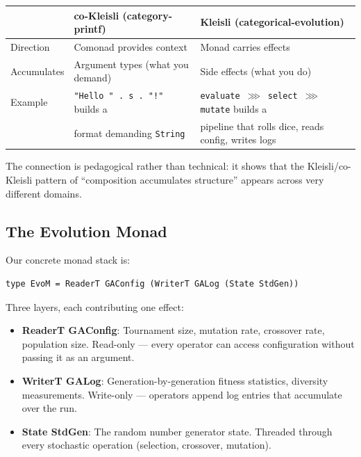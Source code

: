 \documentclass[10pt]{article}
\begin{document}
\begin{table}[ht]
\centering
\small
\begin{tabular}{@{}lll@{}}
\toprule
 & \textbf{co-Kleisli (category-printf)} & \textbf{Kleisli (categorical-evolution)} \\
\midrule
Direction    & Comonad provides context & Monad carries effects \\
Accumulates  & Argument types (what you demand) & Side effects (what you do) \\
Example      & \texttt{"Hello " . s . "!"} builds a & \texttt{evaluate $\ggg$ select $\ggg$ mutate} builds a \\
             & format demanding \texttt{String}     & pipeline that rolls dice, reads config, writes logs \\
\bottomrule
\end{tabular}
\end{table}

The connection is pedagogical rather than technical: it shows that the Kleisli/co-Kleisli pattern of ``composition accumulates structure'' appears across very different domains.


\subsection{The Evolution Monad}

Our concrete monad stack is:

\begin{lstlisting}[style=haskellstyle]
type EvoM = ReaderT GAConfig (WriterT GALog (State StdGen))
\end{lstlisting}

Three layers, each contributing one effect:

\begin{itemize}
  \item \textbf{ReaderT GAConfig}: Tournament size, mutation rate, crossover rate, population size. Read-only --- every operator can access configuration without passing it as an argument.
  \item \textbf{WriterT GALog}: Generation-by-generation fitness statistics, diversity measurements. Write-only --- operators append log entries that accumulate over the run.
  \item \textbf{State StdGen}: The random number generator state. Threaded through every stochastic operation (selection, crossover, mutation).
\end{itemize}
\end{document}
